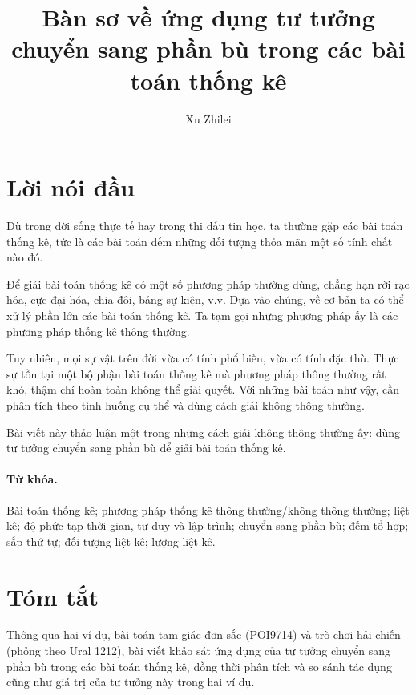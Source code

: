 \documentclass[11pt]{article}
\title{Bàn sơ về ứng dụng tư tưởng chuyển sang phần bù trong các bài toán thống kê}
\author{Xu Zhilei}
\date{}
\begin{document}
\maketitle


\renewcommand{\contentsname}{Mục lục}
\renewcommand{\figurename}{Hình}
\tableofcontents

\section*{Lời nói đầu}

Dù trong đời sống thực tế hay trong thi đấu tin học, ta thường gặp các
bài toán thống kê, tức là các bài toán đếm những đối tượng thỏa mãn một
số tính chất nào đó.

Để giải bài toán thống kê có một số phương pháp thường dùng, chẳng hạn
rời rạc hóa, cực đại hóa, chia đôi, bảng sự kiện, v.v. Dựa vào chúng, về
cơ bản ta có thể xử lý phần lớn các bài toán thống kê. Ta tạm gọi những
phương pháp ấy là các phương pháp thống kê thông thường.

Tuy nhiên, mọi sự vật trên đời vừa có tính phổ biến, vừa có tính đặc
thù. Thực sự tồn tại một bộ phận bài toán thống kê mà phương pháp thông
thường rất khó, thậm chí hoàn toàn không thể giải quyết. Với những bài
toán như vậy, cần phân tích theo tình huống cụ thể và dùng cách giải
không thông thường.

Bài viết này thảo luận một trong những cách giải không thông thường ấy:
dùng tư tưởng chuyển sang phần bù để giải bài toán thống kê.

\paragraph{Từ khóa.}
Bài toán thống kê; phương pháp thống kê thông thường/không thông thường;
liệt kê; độ phức tạp thời gian, tư duy và lập trình; chuyển sang phần bù;
đếm tổ hợp; sắp thứ tự; đối tượng liệt kê; lượng liệt kê.

\section*{Tóm tắt}

Thông qua hai ví dụ, bài toán tam giác đơn sắc (POI9714) và trò chơi hải
chiến (phỏng theo Ural 1212), bài viết khảo sát ứng dụng của tư tưởng
chuyển sang phần bù trong các bài toán thống kê, đồng thời phân tích và
so sánh tác dụng cũng như giá trị của tư tưởng này trong hai ví dụ.
\end{document}
